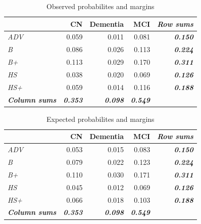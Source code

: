 \documentclass[
  ignorenonframetext,
]{beamer}
\begin{document}
\begin{frame}

\begin{table}[t]

\caption{\label{tab:edu_dx_chi2_osums}Observed probabilites and margins}
\centering
\begin{tabular}{>{\em}lrrr>{\bfseries\em}r}
\toprule
  & CN & Dementia & MCI & Row sums\\
\midrule
ADV & 0.059 & 0.011 & 0.081 & 0.150\\
B & 0.086 & 0.026 & 0.113 & 0.224\\
B+ & 0.113 & 0.029 & 0.170 & 0.311\\
HS & 0.038 & 0.020 & 0.069 & 0.126\\
HS+ & 0.059 & 0.014 & 0.116 & 0.188\\
\addlinespace
\em{\textbf{Column sums}} & \em{\textbf{0.353}} & \em{\textbf{0.098}} & \em{\textbf{0.549}}\\
\bottomrule
\end{tabular}
\end{table}

\end{frame}

\begin{frame}

\begin{table}[t]

\caption{\label{tab:edu_dx_chi2_e}Expected probabilites and margins}
\centering
\begin{tabular}{>{\em}lrrr>{\bfseries\em}r}
\toprule
  & CN & Dementia & MCI & Row sums\\
\midrule
ADV & 0.053 & 0.015 & 0.083 & 0.150\\
B & 0.079 & 0.022 & 0.123 & 0.224\\
B+ & 0.110 & 0.030 & 0.171 & 0.311\\
HS & 0.045 & 0.012 & 0.069 & 0.126\\
HS+ & 0.066 & 0.018 & 0.103 & 0.188\\
\addlinespace
\em{\textbf{Column sums}} & \em{\textbf{0.353}} & \em{\textbf{0.098}} & \em{\textbf{0.549}}\\
\bottomrule
\end{tabular}
\end{table}

\end{frame}
\end{document}
